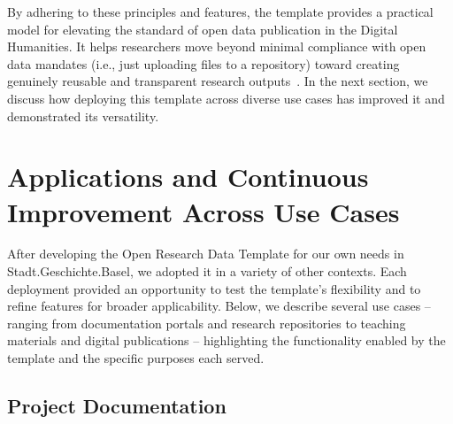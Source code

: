 \documentclass[final]{anthology-ch} %
\begin{document}
By adhering to these principles and features, the template provides a practical model for elevating the standard of open data publication in the Digital Humanities. It helps researchers move beyond minimal compliance with open data mandates (i.e., just uploading files to a repository) toward creating genuinely reusable and transparent research outputs~\cite{diekjobst2024a}. In the next section, we discuss how deploying this template across diverse use cases has improved it and demonstrated its versatility.

\section{Applications and Continuous Improvement Across Use Cases}\label{applications-and-continuous-improvement-across-use-cases}

After developing the Open Research Data Template for our own needs in Stadt.Geschichte.Basel, we adopted it in a variety of other contexts. Each deployment provided an opportunity to test the template's flexibility and to refine features for broader applicability. Below, we describe several use cases -- ranging from documentation portals and research repositories to teaching materials and digital publications -- highlighting the functionality enabled by the template and the specific purposes each served.

\subsection{Project Documentation}\label{project-documentation}
\end{document}
